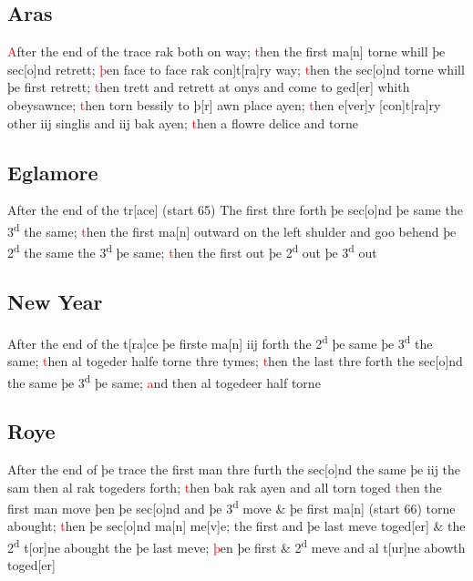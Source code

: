 \documentclass[12pt,letter]{article} %
\newcommand{\red}[1]{\textcolor{red}{#1}}
\newcommand{\srcpg}[1]{(start #1)}
\begin{document}
\subsection{Aras}
\red{A}fter the end of the trace rak both on way; \red{t}hen the first ma{[}n{]}
torne whill þe sec{[}o{]}nd retrett; \red{þ}en face to face rak
\marginnote{2}{[}con{]}t{[}ra{]}ry way; \red{t}hen the sec{[}o{]}nd torne whill þe first
retrett; \red{t}hen trett and retrett at onys and come to ged{[}er{]} whith
obeysawnce; \red{t}hen torn bessily to þ{[}r{]} awn place ayen; \red{t}hen
e{[}ver{]}y {[}con{]}t{[}ra{]}ry other iij singlis and iij bak ayen;
\red{t}hen a flowre delice and torne

\subsection{Eglamore}
After the end of the tr{[}ace{]} \srcpg{65} The first thre forth þe
sec{[}o{]}nd þe same the 3\textsuperscript{d} the same; \red{t}hen the first
ma{[}n{]} outward on the left shulder and goo behend þe
2\textsuperscript{d} the same the 3\textsuperscript{d} þe same; \red{t}hen the
first out þe 2\textsuperscript{d} out þe 3\textsuperscript{d} out

\subsection{New Year}
After the end of the t{[}ra{]}ce þe firste ma{[}n{]} iij forth the
2\textsuperscript{d} þe same þe 3\textsuperscript{d} the same; \red{t}hen al
togeder halfe torne thre tymes; \red{t}hen the last thre forth the
sec{[}o{]}nd the same þe 3\textsuperscript{d} þe same; \red{a}nd then al
togedeer half torne

\subsection{Roye}
After the end of þe trace the first man thre furth the sec{[}o{]}nd the
 same þe iij the sam then al rak togeders forth; \red{t}hen bak rak ayen and
all torn toged \red{t}hen the first man move þen þe sec{[}o{]}nd and þe
3\textsuperscript{d} move \& þe first ma{[}n{]} \srcpg{66} torne
abought; \red{t}hen þe sec{[}o{]}nd ma{[}n{]} me{[}v{]}e; the first and þe
last meve toged{[}er{]} \& the 2\textsuperscript{d} t{[}or{]}ne abought
the þe last meve; \red{þ}en þe first \& 2\textsuperscript{d} meve and al
t{[}ur{]}ne abowth toged{[}er{]}
\end{document}
